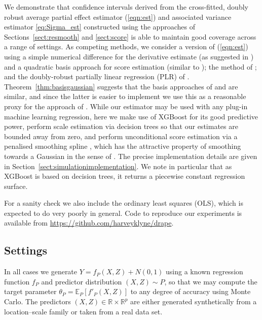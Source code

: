 \documentclass[aos]{imsart}
\newcommand{\R}{\mathbb{R}}
\newcommand{\E}{\mathbb{E}}
\begin{document}
	We demonstrate that confidence intervals derived from the cross-fitted, doubly robust average partial effect estimator (\ref{eqn:est}) and associated variance estimator \eqref{eq:Sigma_est} constructed using the approaches of Sections~\ref{sect:resmooth} and \ref{sect:score} is able to maintain good coverage across a range of settings. As competing methods, we consider a version of (\ref{eqn:est}) using a simple numerical difference for the derivative estimate (as suggested in \citet[\S S5.2]{ChernozhukovRiesz}) and a quadratic basis approach for score estimation (similar to \cite{RothenhauslerICE}); the method of \cite{RothenhauslerICE}; and the doubly-robust partially linear regression (PLR) of \citet[\S 4.1]{ChernozhukovTreatment}. Theorem~\ref{thm:basisgaussian} suggests that the basis approaches of \citet[\S 2]{ChernozhukovRiesz} and \cite{RothenhauslerICE} are similar, and since the latter is easier to implement we use this as a reasonable proxy for the approach of \citet{ChernozhukovRiesz}. While our estimator may be used with any plug-in machine learning regression, here we make use of XGBoost \citep{xgboost} for its good predictive power, perform scale estimation via decision trees so that our estimates are bounded away from zero, and perform unconditional score estimation via a penalised smoothing spline \citep{CoxSpline, NgSpline, NgSplineImplementation}, which has the attractive property of smoothing towards a Gaussian in the sense of \citet[Thm.~4]{CoxSpline}. The precise implementation details are given in Section~\ref{sect:simulationimplementation}. We note in particular that as XGBoost is based on decision trees, it returns a piecewise constant regression surface.
	
	For a sanity check we also include the ordinary least squares (OLS), which is expected to do very poorly in general. Code to reproduce our experiments is available from \url{https://github.com/harveyklyne/drape}.
	
	
	\subsection{Settings}
	
	In all cases we generate $Y = f_P(X,Z) + N(0,1)$ using a known regression function $f_P$ and predictor distribution $(X,Z)\sim P$, so that we may compute the target parameter $\theta_P = \E_P[f'_P(X,Z)]$ to any degree of accuracy using Monte Carlo. The predictors $(X,Z) \in \R \times \R^p$ are either generated synthetically from a location--scale family or taken from a real data set.
	
\end{document}
